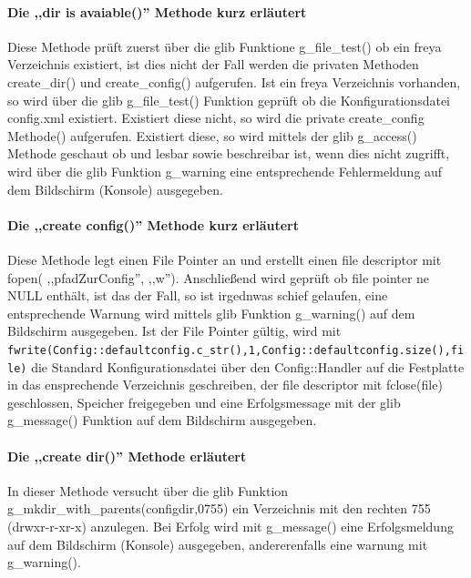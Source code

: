 \paragraph{Die ,,dir is avaiable()'' Methode kurz erläutert}
Diese Methode prüft zuerst über die glib Funktione g\_file\_test() ob ein freya Verzeichnis existiert,
ist dies nicht der Fall werden die privaten Methoden create\_dir() und create\_config() aufgerufen.
Ist ein freya Verzeichnis vorhanden, so wird über die glib g\_file\_test() Funktion geprüft ob die Konfigurationsdatei
config.xml existiert. Existiert diese nicht, so wird die private create\_config Methode() aufgerufen.
Existiert diese, so wird mittels der glib g\_access() Methode geschaut ob und lesbar sowie beschreibar ist, 
wenn dies nicht zugrifft, wird über die glib Funktion g\_warning eine entsprechende Fehlermeldung auf
dem Bildschirm (Konsole) ausgegeben.


\paragraph{Die ,,create config()'' Methode kurz erläutert}
Diese Methode legt einen File Pointer an und erstellt einen file descriptor mit fopen( ,,pfadZurConfig'', ,,w'').
Anschließend wird geprüft ob file pointer ne NULL enthält, ist das der Fall, so ist irgednwas schief gelaufen, eine
entsprechende Warnung wird mittels glib Funktion g\_warning() auf dem Bildschirm ausgegeben.
Ist der File Pointer gültig, wird mit \verb+fwrite(Config::defaultconfig.c_str(),1,Config::defaultconfig.size(),file)+ die
Standard Konfigurationsdatei über den Config::Handler auf die Festplatte in das ensprechende Verzeichnis geschreiben,
der file descriptor mit fclose(file) geschlossen, Speicher freigegeben und eine Erfolgsmessage mit der glib g\_message()
Funktion auf dem Bildschirm ausgegeben.

\paragraph{Die ,,create dir()'' Methode erläutert}
In dieser Methode versucht über die glib Funktion g\_mkdir\_with\_parents(configdir,0755) ein Verzeichnis
mit den rechten 755 (drwxr-r-xr-x) anzulegen. Bei Erfolg wird mit g\_message() eine Erfolgsmeldung auf dem Bildschirm (Konsole)
ausgegeben, andererenfalls eine warnung mit g\_warning().



